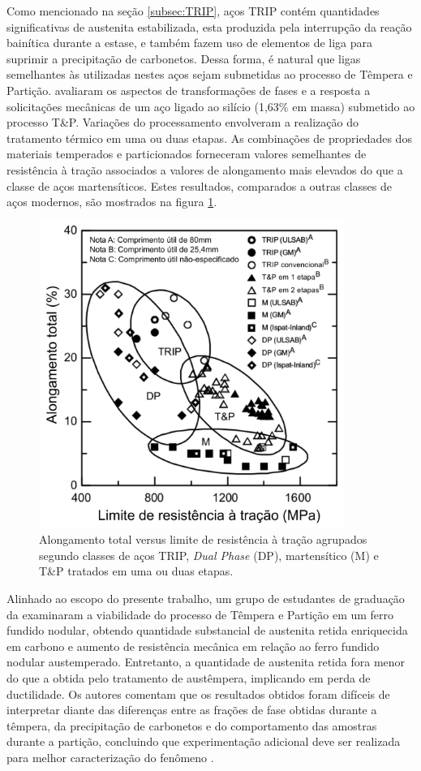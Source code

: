 Como mencionado na seção \ref{subsec:TRIP}, aços TRIP contém quantidades significativas de austenita estabilizada, esta produzida pela interrupção da reação bainítica durante a estase, e também fazem uso de elementos de liga para suprimir a precipitação de carbonetos. Dessa forma, é natural que ligas semelhantes às utilizadas nestes aços sejam submetidas ao processo de Têmpera e Partição.  %
avaliaram os aspectos de transformações de fases e a resposta a solicitações mecânicas de um aço ligado ao silício (1,63\% em massa) submetido ao processo T\&P. Variações do processamento envolveram a realização do tratamento térmico em uma ou duas etapas. As combinações de propriedades dos materiais temperados e particionados forneceram valores semelhantes de resistência à tração associados a valores de alongamento mais elevados do que a classe de aços martensíticos. Estes resultados, comparados a outras classes de aços modernos, são mostrados na figura \ref{fig:TRIPQP}.

\begin{figure}
	\includegraphics[height=10cm]{img/Streicher.pdf}
	\caption{Alongamento total versus limite de resistência à tração agrupados segundo classes de aços TRIP, \textit{Dual Phase} (DP), martensítico (M) e T\&P tratados em uma ou duas etapas\cite{Streicher2004}.}
	\label{fig:TRIPQP}
\end{figure}

Alinhado ao escopo do presente trabalho, um grupo de estudantes de graduação da  examinaram a viabilidade do processo de Têmpera e Partição em um ferro fundido nodular, obtendo quantidade substancial de austenita retida enriquecida em carbono e aumento de resistência mecânica em relação ao ferro fundido nodular austemperado. Entretanto, a quantidade de austenita retida fora menor do que a obtida pelo tratamento de austêmpera, implicando em perda de ductilidade. Os autores comentam que os resultados obtidos foram difíceis de interpretar diante das diferenças entre as frações de fase obtidas durante a têmpera, da precipitação de carbonetos e do comportamento das amostras durante a partição, concluindo que experimentação adicional deve ser realizada para melhor caracterização do fenômeno \cite{Speer2004}.

